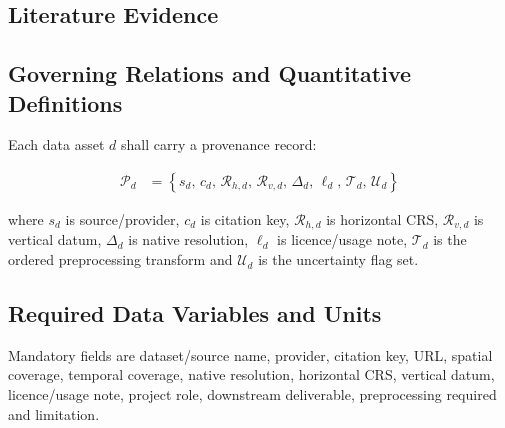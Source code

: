 
\subsection{Literature Evidence}
\label{sec:res-dat-unc-literature-evidence}

%

\subsection{Governing Relations and Quantitative Definitions}
\label{sec:res-dat-unc-governing-relations}

%

Each data asset $d$ shall carry a provenance record:

\begin{align}
  \mathcal{P}_{d}
  &=
  \left\{
    s_d,\,
    c_d,\,
    \mathcal{R}_{h,d},\,
    \mathcal{R}_{v,d},\,
    \Delta_d,\,
    \ell_d,\,
    \mathcal{T}_d,\,
    \mathcal{U}_d
  \right\}
  \label{eq:res-dat-unc-provenance-record}
\end{align}

where $s_d$ is source/provider, $c_d$ is citation key,
$\mathcal{R}_{h,d}$ is horizontal CRS, $\mathcal{R}_{v,d}$ is vertical
datum, $\Delta_d$ is native resolution, $\ell_d$ is licence/usage note,
$\mathcal{T}_d$ is the ordered preprocessing transform and
$\mathcal{U}_d$ is the uncertainty flag set.

\subsection{Required Data Variables and Units}
\label{sec:res-dat-unc-required-data-variables-units}

Mandatory fields are dataset/source name, provider, citation key, URL,
spatial coverage, temporal coverage, native resolution, horizontal CRS,
vertical datum, licence/usage note, project role, downstream
deliverable, preprocessing required and limitation.

